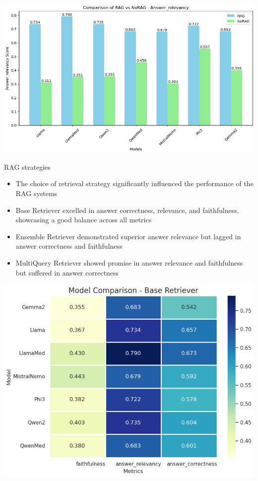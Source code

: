 \documentclass[handout]{beamer}\mode<handout>{\usetheme{AMSBolognaFC}}
\begin{document}
\begin{frame}[allowframebreaks]
    \vfill
    \centering
    \includegraphics[width=\textwidth]{figures/RAGvsNoRAG_relevancy}

    \framebreak

    \begin{block}{RAG strategies}
        \begin{itemize}
            \item The choice of retrieval strategy significantly influenced the performance of the RAG systems
            \item Base Retriever excelled in answer correctness, relevance, and faithfulness, showcasing a \alert{good balance} across all metrics
            \item Ensemble Retriever demonstrated \alert{superior answer relevance} but lagged in answer correctness and faithfulness
            \item MultiQuery Retriever showed \alert{promise in answer relevance and faithfulness} but suffered in answer correctness
        \end{itemize}
    \end{block}

    \framebreak

    \vfill
    \centering
    \includegraphics[height=0.8\textheight]{figures/baseretreiver}


\end{frame}
\end{document}
